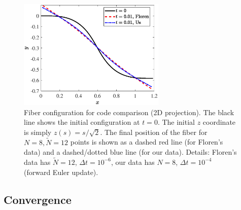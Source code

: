 \documentclass{article}
\begin{document}
\begin{figure}
\centering 
\includegraphics[width=70mm]{Local/FiberInitial.eps}
\caption{Fiber configuration for code comparison (2D projection). The black line shows the initial configuration at $t=0$. The initial $z$ coordinate is simply $z(s)=s/\sqrt{2}$. The final position of the fiber for $N=8, \tilde{N}=12$ points is shown as a dashed red line (for Floren's data) and a dashed/dotted blue line (for our data). Details: Floren's data has $\tilde{N}=12$, $\Delta t =10^{-6}$, our data has $N=8$, $\Delta t=10^{-4}$ (forward Euler update).}
\label{fig:3Dfibt0}
\end{figure}

\subsection{Convergence}
\label{sec:conv}
\end{document}
